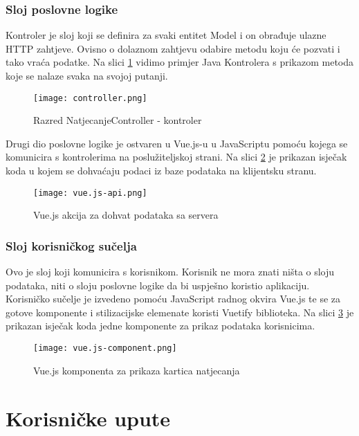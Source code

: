 \documentclass[times, utf8, zavrsni]{fer}
\begin{document}
\subsection{Sloj poslovne logike}

Kontroler  je sloj koji se definira za svaki entitet Model i on obrađuje ulazne HTTP zahtjeve. Ovisno o dolaznom zahtjevu
odabire metodu koju će pozvati i tako vraća podatke. Na slici \ref{fig:controller} vidimo primjer Java Kontrolera s prikazom metoda
koje se nalaze svaka na svojoj putanji.

\begin{figure}[!h]
    \centering
    \texttt{[image: controller.png]}
    \centering
    \caption{Razred NatjecanjeController - kontroler}
    \label{fig:controller}
\end{figure}

Drugi dio poslovne logike je ostvaren u Vue.js-u u JavaScriptu pomoću kojega se komunicira s kontrolerima na poslužiteljskoj strani.
Na slici \ref{fig:vue.js-api} je prikazan isječak koda u kojem se dohvaćaju podaci iz baze podataka na klijentsku stranu. 

\begin{figure}[!h]
    \centering
    \texttt{[image: vue.js-api.png]}
    \centering
    \caption{Vue.js akcija za dohvat podataka sa servera}
    \label{fig:vue.js-api}
\end{figure}

\subsection{Sloj korisničkog sučelja}
Ovo je sloj koji komunicira s korisnikom. Korisnik ne mora znati ništa o sloju podataka, niti o sloju poslovne logike da bi uspješno
koristio aplikaciju. Korisničko sučelje je izvedeno pomoću JavaScript radnog okvira Vue.js te se za gotove komponente i stilizacijske
elemenate koristi Vuetify biblioteka. Na slici \ref{fig:vue.js-component} je prikazan isječak koda jedne komponente za prikaz podataka korisnicima.

\begin{figure}[!h]
    \centering
    \texttt{[image: vue.js-component.png]}
    \centering
    \caption{Vue.js komponenta za prikaza kartica natjecanja}
    \label{fig:vue.js-component}
\end{figure}


\chapter{Korisničke upute}
\end{document}
